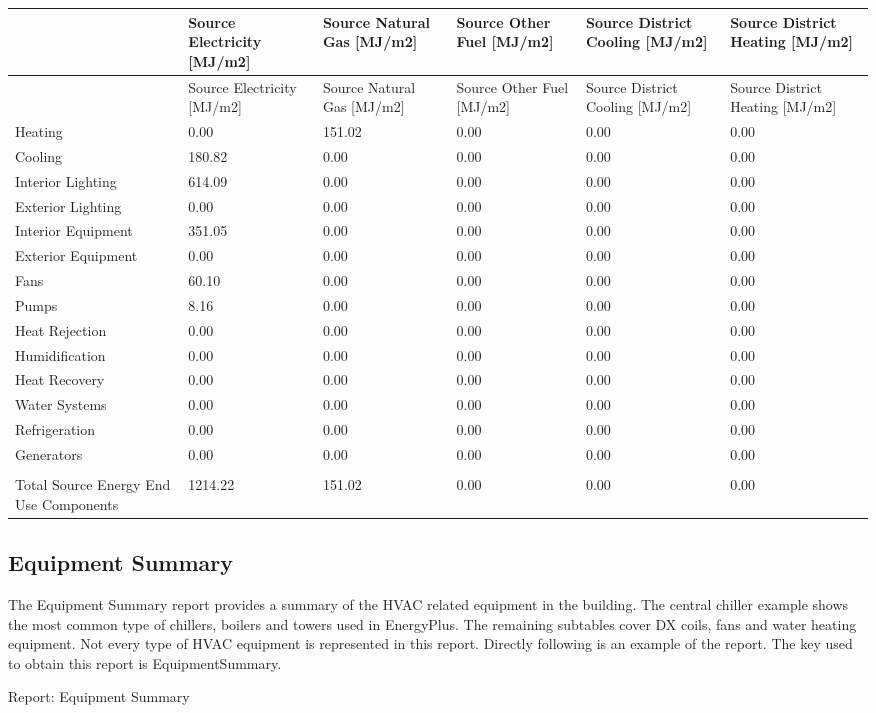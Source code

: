 \begin{longtable}[c]{>{\raggedright}p{1.0in}>{\raggedright}p{1.0in}>{\raggedright}p{1.0in}>{\raggedright}p{1.0in}>{\raggedright}p{1.0in}>{\raggedright}p{1.0in}}
\toprule 
 & Source Electricity [MJ/m2] & Source Natural Gas [MJ/m2] & Source Other Fuel [MJ/m2] & Source District Cooling [MJ/m2] & Source District Heating [MJ/m2] \tabularnewline
\midrule
\endfirsthead

\toprule 
 & Source Electricity [MJ/m2] & Source Natural Gas [MJ/m2] & Source Other Fuel [MJ/m2] & Source District Cooling [MJ/m2] & Source District Heating [MJ/m2] \tabularnewline
\midrule
\endhead

Heating & 0.00 & 151.02 & 0.00 & 0.00 & 0.00 \tabularnewline
Cooling & 180.82 & 0.00 & 0.00 & 0.00 & 0.00 \tabularnewline
Interior Lighting & 614.09 & 0.00 & 0.00 & 0.00 & 0.00 \tabularnewline
Exterior Lighting & 0.00 & 0.00 & 0.00 & 0.00 & 0.00 \tabularnewline
Interior Equipment & 351.05 & 0.00 & 0.00 & 0.00 & 0.00 \tabularnewline
Exterior Equipment & 0.00 & 0.00 & 0.00 & 0.00 & 0.00 \tabularnewline
Fans & 60.10 & 0.00 & 0.00 & 0.00 & 0.00 \tabularnewline
Pumps & 8.16 & 0.00 & 0.00 & 0.00 & 0.00 \tabularnewline
Heat Rejection & 0.00 & 0.00 & 0.00 & 0.00 & 0.00 \tabularnewline
Humidification & 0.00 & 0.00 & 0.00 & 0.00 & 0.00 \tabularnewline
Heat Recovery & 0.00 & 0.00 & 0.00 & 0.00 & 0.00 \tabularnewline
Water Systems & 0.00 & 0.00 & 0.00 & 0.00 & 0.00 \tabularnewline
Refrigeration & 0.00 & 0.00 & 0.00 & 0.00 & 0.00 \tabularnewline
Generators & 0.00 & 0.00 & 0.00 & 0.00 & 0.00 \tabularnewline
 &  &  &  &  &  \tabularnewline
Total Source Energy End Use Components & 1214.22 & 151.02 & 0.00 & 0.00 & 0.00 \tabularnewline
\bottomrule
\end{longtable}

\subsection{Equipment Summary}\label{equipment-summary}

The Equipment Summary report provides a summary of the HVAC related equipment in the building. The central chiller example shows the most common type of chillers, boilers and towers used in EnergyPlus. The remaining subtables cover DX coils, fans and water heating equipment. Not every type of HVAC equipment is represented in this report. Directly following is an example of the report. The key used to obtain this report is EquipmentSummary.

Report: Equipment Summary

